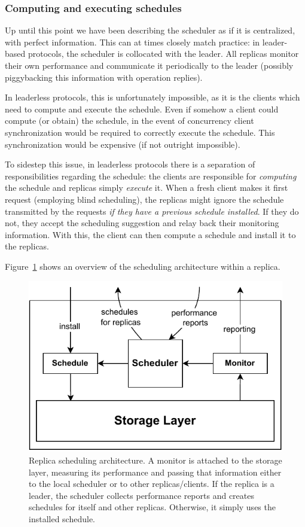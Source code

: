 
\subsubsection{Computing and executing schedules}\label{sssec:schedule_computation}

Up until this point we have been describing the scheduler as if
it is centralized, with perfect information. This can at times
closely match practice: in leader-based protocols, the scheduler
is collocated with the leader. All replicas monitor their own
performance and communicate it periodically to the leader
(possibly piggybacking this information with operation replies).

In leaderless protocols, this is unfortunately impossible, as it
is the clients which need to compute and execute the schedule.
Even if somehow a client could compute (or obtain) the schedule,
in the event of concurrency client synchronization would be
required to correctly execute the schedule. This synchronization
would be expensive (if not outright impossible).

To sidestep this issue, in leaderless protocols there is a
separation of responsibilities regarding the schedule: the
clients are responsible for \emph{computing} the schedule and
replicas simply \emph{execute} it. When a fresh client makes it
first request (employing blind scheduling), the replicas might
ignore the schedule transmitted by the requests \emph{if they
have a previous schedule installed}. If they do not, they accept
the scheduling suggestion and relay back their monitoring
information. With this, the client can then compute a schedule
and install it to the replicas.

Figure~\ref{fig:replica} shows an overview of the scheduling
architecture within a replica.

\begin{figure}[ht]
    \centering
    \includegraphics[width=.8\linewidth]{img/replica}
    \caption{Replica scheduling architecture. A monitor is attached to
    the storage layer, measuring its performance and passing that
    information either to the local scheduler or to other
    replicas/clients. If the replica is a leader, the scheduler
    collects performance reports and creates schedules for itself
    and other replicas. Otherwise, it simply uses the installed
    schedule.}\label{fig:replica}
\end{figure}

